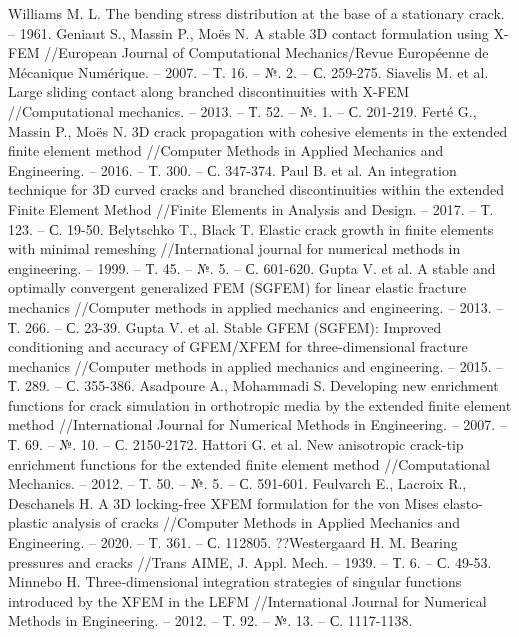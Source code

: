 \begin{thebibliography}{3}
Williams M. L. The bending stress distribution at the base of a stationary crack. – 1961.
Geniaut S., Massin P., Moës N. A stable 3D contact formulation using X-FEM //European Journal of Computational Mechanics/Revue Européenne de Mécanique Numérique. – 2007. – Т. 16. – №. 2. – С. 259-275.
Siavelis M. et al. Large sliding contact along branched discontinuities with X-FEM //Computational mechanics. – 2013. – Т. 52. – №. 1. – С. 201-219.
Ferté G., Massin P., Moës N. 3D crack propagation with cohesive elements in the extended finite element method //Computer Methods in Applied Mechanics and Engineering. – 2016. – Т. 300. – С. 347-374.
Paul B. et al. An integration technique for 3D curved cracks and branched discontinuities within the extended Finite Element Method //Finite Elements in Analysis and Design. – 2017. – Т. 123. – С. 19-50.
Belytschko T., Black T. Elastic crack growth in finite elements with minimal remeshing //International journal for numerical methods in engineering. – 1999. – Т. 45. – №. 5. – С. 601-620.
Gupta V. et al. A stable and optimally convergent generalized FEM (SGFEM) for linear elastic fracture mechanics //Computer methods in applied mechanics and engineering. – 2013. – Т. 266. – С. 23-39.
Gupta V. et al. Stable GFEM (SGFEM): Improved conditioning and accuracy of GFEM/XFEM for three-dimensional fracture mechanics //Computer methods in applied mechanics and engineering. – 2015. – Т. 289. – С. 355-386.
Asadpoure A., Mohammadi S. Developing new enrichment functions for crack simulation in orthotropic media by the extended finite element method //International Journal for Numerical Methods in Engineering. – 2007. – Т. 69. – №. 10. – С. 2150-2172.
Hattori G. et al. New anisotropic crack-tip enrichment functions for the extended finite element method //Computational Mechanics. – 2012. – Т. 50. – №. 5. – С. 591-601.
Feulvarch E., Lacroix R., Deschanels H. A 3D locking-free XFEM formulation for the von Mises elasto-plastic analysis of cracks //Computer Methods in Applied Mechanics and Engineering. – 2020. – Т. 361. – С. 112805.
??Westergaard H. M. Bearing pressures and cracks //Trans AIME, J. Appl. Mech. – 1939. – Т. 6. – С. 49-53.
Minnebo H. Three‐dimensional integration strategies of singular functions introduced by the XFEM in the LEFM //International Journal for Numerical Methods in Engineering. – 2012. – Т. 92. – №. 13. – С. 1117-1138.

\end{thebibliography}
